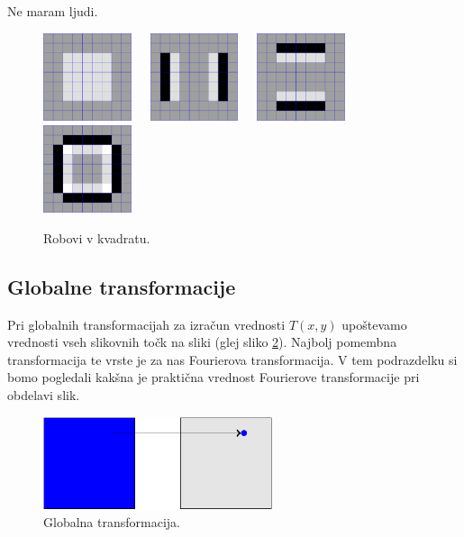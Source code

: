 Ne maram ljudi.

%
\begin{figure}[htbp]
  \centering
  \includegraphics[width=0.23\textwidth]{./slike-latex/rob-kvadrat}\ \ \ 
  \includegraphics[width=0.23\textwidth]{./slike-latex/rob-kvadrat-vodoravno}\ \ \  
  \includegraphics[width=0.23\textwidth]{./slike-latex/rob-kvadrat-navpicno}\ \ \ 
  \includegraphics[width=0.23\textwidth]{./slike-latex/rob-kvadrat-vod-nav}
  \caption{Robovi v kvadratu.}
  \label{fig:roboviKvadrat}
\end{figure}
%
\subsection{Globalne transformacije}
Pri globalnih transformacijah za izračun vrednosti $T(x, y)$ upoštevamo vrednosti vseh slikovnih točk na sliki (glej sliko \ref{fig:globalnaT}). Najbolj pomembna transformacija te vrste je za nas Fourierova transformacija. V tem podrazdelku si bomo pogledali kakšna je praktična vrednost Fourierove transformacije pri obdelavi slik. 

%
\begin{figure}[htbp]
  \centering
  \includegraphics[width=0.6\textwidth]{./slike-latex/globalnaT}
  \caption{Globalna transformacija.}
  \label{fig:globalnaT}
\end{figure}
%

